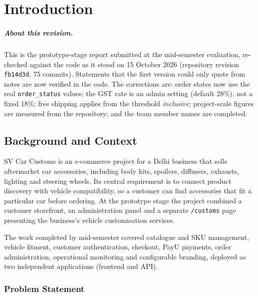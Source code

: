 \documentclass{tietreport}
\begin{document}
\maketitle
{}
\tableofcontents
\cleardoublepage
{}

\chapter{Introduction}

\paragraph{About this revision.}
This is the prototype-stage report submitted at the mid-semester evaluation,
re-checked against the code as it stood on 15 October 2026 (repository
revision \texttt{fb14d3d}, 75 commits). Statements that the first version
could only quote from notes are now verified in the code. The corrections are:
order states now use the real \texttt{order\_status} values; the GST rate is
an admin setting (default 28\%), not a fixed 18\%; free shipping applies from
the threshold \emph{inclusive}; project-scale figures are measured from the
repository; and the team member names are completed.

\section{Background and Context}

SV Car Customs is an e-commerce project for a Delhi business that sells
aftermarket car accessories, including body kits, spoilers, diffusers,
exhausts, lighting and steering wheels. Its central requirement is to connect
product discovery with vehicle compatibility, so a customer can find
accessories that fit a particular car before ordering. At the prototype stage
the project combined a customer storefront, an administration panel and a
separate \texttt{/customs} page presenting the business's vehicle
customisation services.

The work completed by mid-semester covered catalogue and SKU management,
vehicle fitment, customer authentication, checkout, PayU payments, order
administration, operational monitoring and configurable branding, deployed
as two independent applications (frontend and API).

\subsection{Problem Statement}
\end{document}
